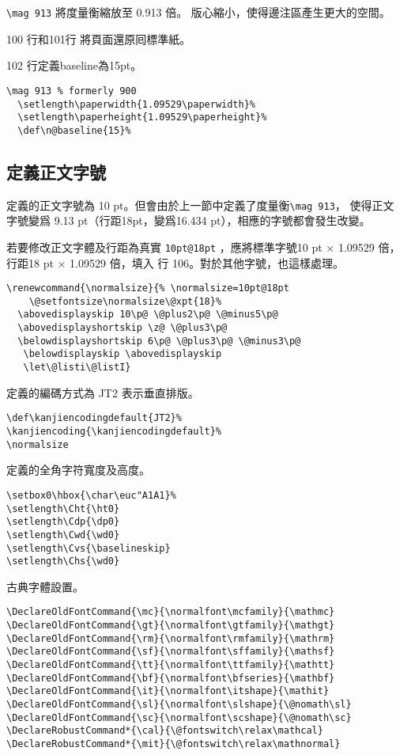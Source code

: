 \par \verb+\mag 913+ 將度量衡縮放至 0.913 倍。 
版心縮小，使得邊注區產生更大的空間。
\par 100 行和101行 將頁面還原囘標準紙。
\par 102 行定義baseline為15pt。
\begin{lstlisting}[firstnumber=99]
  \mag 913 % formerly 900
  \setlength\paperwidth{1.09529\paperwidth}%
  \setlength\paperheight{1.09529\paperheight}%
  \def\n@baseline{15}%
\end{lstlisting}

\subsection{定義正文字號}
\par 定義的正文字號為 10 pt。但會由於上一節中定義了度量衡\verb+\mag 913+，
使得正文字號變爲 9.13 pt（行距18pt，變爲16.434 pt），相應的字號都會發生改變。

\par {}
\par 若要修改正文字體及行距為真實 \verb+10pt@18pt+ ，應將標準字號10 pt × 1.09529 倍，
行距18 pt × 1.09529 倍，填入 行 106。對於其他字號，也這樣處理。
%
\begin{lstlisting}[firstnumber=105]
\renewcommand{\normalsize}{% \normalsize=10pt@18pt
    \@setfontsize\normalsize\@xpt{18}%
  \abovedisplayskip 10\p@ \@plus2\p@ \@minus5\p@
  \abovedisplayshortskip \z@ \@plus3\p@
  \belowdisplayshortskip 6\p@ \@plus3\p@ \@minus3\p@
   \belowdisplayskip \abovedisplayskip
   \let\@listi\@listI}
\end{lstlisting}

\par 定義的編碼方式為 JT2 表示垂直排版。
\begin{lstlisting}[firstnumber=113]
\def\kanjiencodingdefault{JT2}%
\kanjiencoding{\kanjiencodingdefault}%
\normalsize
\end{lstlisting}

\par 定義的全角字符寬度及高度。
\begin{lstlisting}[firstnumber=116]
\setbox0\hbox{\char\euc"A1A1}%
\setlength\Cht{\ht0}
\setlength\Cdp{\dp0}
\setlength\Cwd{\wd0}
\setlength\Cvs{\baselineskip}
\setlength\Chs{\wd0}
\end{lstlisting}


\par 古典字體設置。
\begin{lstlisting}[firstnumber=124]
\DeclareOldFontCommand{\mc}{\normalfont\mcfamily}{\mathmc}
\DeclareOldFontCommand{\gt}{\normalfont\gtfamily}{\mathgt}
\DeclareOldFontCommand{\rm}{\normalfont\rmfamily}{\mathrm}
\DeclareOldFontCommand{\sf}{\normalfont\sffamily}{\mathsf}
\DeclareOldFontCommand{\tt}{\normalfont\ttfamily}{\mathtt}
\DeclareOldFontCommand{\bf}{\normalfont\bfseries}{\mathbf}
\DeclareOldFontCommand{\it}{\normalfont\itshape}{\mathit}
\DeclareOldFontCommand{\sl}{\normalfont\slshape}{\@nomath\sl}
\DeclareOldFontCommand{\sc}{\normalfont\scshape}{\@nomath\sc}
\DeclareRobustCommand*{\cal}{\@fontswitch\relax\mathcal}
\DeclareRobustCommand*{\mit}{\@fontswitch\relax\mathnormal}
\end{lstlisting}

